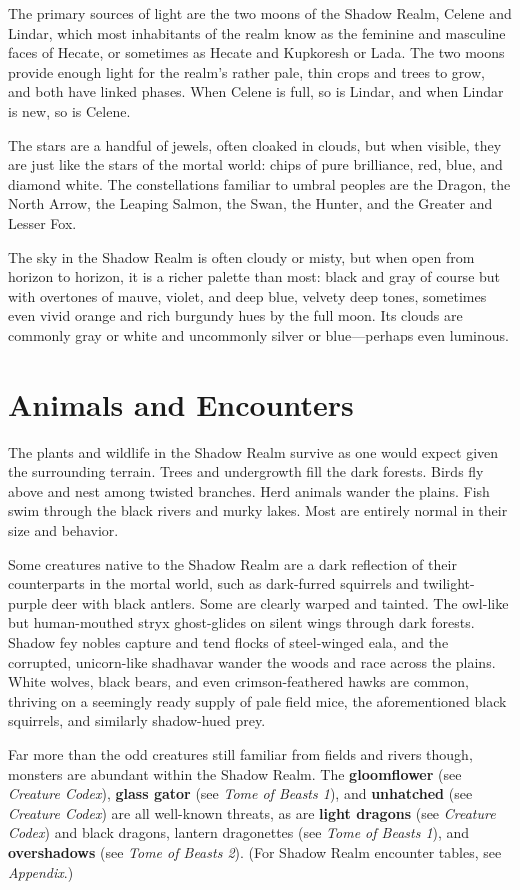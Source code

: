\documentclass[10pt,a4paper,twoside,bg=print,twocolumn,openany,nodeprecatedcode]{dndbook}
\begin{document}
The primary sources of light are the two moons of the Shadow Realm, Celene and Lindar, which most inhabitants of the realm know as the feminine and masculine faces of Hecate, or sometimes as Hecate and Kupkoresh or Lada. The two moons provide enough light for the realm's rather pale, thin crops and trees to grow, and both have linked phases. When Celene is full, so is Lindar, and when Lindar is new, so is Celene.

The stars are a handful of jewels, often cloaked in clouds, but when visible, they are just like the stars of the mortal world: chips of pure brilliance, red, blue, and diamond white. The constellations familiar to umbral peoples are the Dragon, the North Arrow, the Leaping Salmon, the Swan, the Hunter, and the Greater and Lesser Fox.

The sky in the Shadow Realm is often cloudy or misty, but when open from horizon to horizon, it is a richer palette than most: black and gray of course but with overtones of mauve, violet, and deep blue, velvety deep tones, sometimes even vivid orange and rich burgundy hues by the full moon. Its clouds are commonly gray or white and uncommonly silver or blue—perhaps even luminous.

\section{Animals and Encounters}
The plants and wildlife in the Shadow Realm survive as one would expect given the surrounding terrain. Trees and undergrowth fill the dark forests. Birds fly above and nest among twisted branches. Herd animals wander the plains. Fish swim through the black rivers and murky lakes. Most are entirely normal in their size and behavior.

Some creatures native to the Shadow Realm are a dark reflection of their counterparts in the mortal world, such as dark-furred squirrels and twilight-purple deer with black antlers. Some are clearly warped and tainted. The owl-like but human-mouthed stryx ghost-glides on silent wings through dark forests. Shadow fey nobles capture and tend flocks of steel-winged eala, and the corrupted, unicorn-like shadhavar wander the woods and race across the plains. White wolves, black bears, and even crimson-feathered hawks are common, thriving on a seemingly ready supply of pale field mice, the aforementioned black squirrels, and similarly shadow-hued prey.

Far more than the odd creatures still familiar from fields and rivers though, monsters are abundant within the Shadow Realm. The \textbf{gloomflower} (see \textit{Creature Codex}), \textbf{glass gator} (see \textit{Tome of Beasts 1}), and \textbf{unhatched} (see \textit{Creature Codex}) are all well-known threats, as are \textbf{light dragons} (see \textit{Creature Codex}) and black dragons, lantern dragonettes (see \textit{Tome of Beasts 1}), and \textbf{overshadows} (see \textit{Tome of Beasts 2}). (For Shadow Realm encounter tables, see \textit{Appendix}.)
\end{document}
